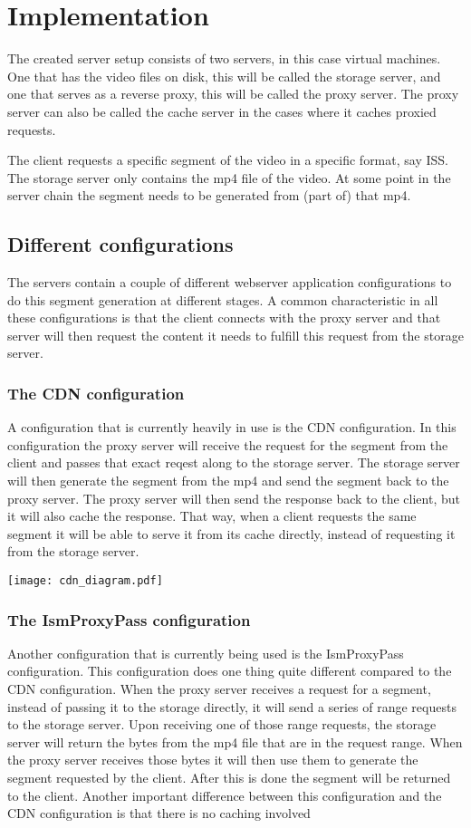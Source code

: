 \documentclass[twoside,openright]{uva-bachelor-thesis}
\begin{document}
\chapter{Implementation}
The created server setup consists of two servers, in this case virtual machines.
One that has the video files on disk, this will be called the storage server,
and one that serves as a reverse proxy, this will be called the proxy server.
The proxy server can also be called the cache server in the cases where it
caches proxied requests.

The client requests a specific segment of the video in a specific format, say
ISS. The storage server only contains the mp4 file of the video. At some point
in the server chain the segment needs to be generated from (part of) that mp4.

\section{Different configurations}
The servers contain a couple of different webserver application configurations
to do this segment generation at different stages. A common characteristic in
all these configurations is that the client connects with the proxy server and
that server will then request the content it needs to fulfill this request from
the storage server.


\subsection{The CDN configuration}
A configuration that is currently heavily in use is the CDN configuration. In
this configuration the proxy server will receive the request for the segment
from the client and passes that exact reqest along to the storage server. The
storage server will then generate the segment from the mp4 and send the segment
back to the proxy server.  The proxy server will then send the response back to
the client, but it will also cache the response. That way, when a client
requests the same segment it will be able to serve it from its cache directly,
instead of requesting it from the storage server.

\texttt{[image: cdn\_diagram.pdf]}



\subsection{The IsmProxyPass configuration}
Another configuration that is currently being used is the IsmProxyPass
configuration. This configuration does one thing quite different compared to the
CDN configuration. When the proxy server receives a request for a segment,
instead of passing it to the storage directly, it will send a series of range
requests to the storage server. Upon receiving one of those range requests, the
storage server will return the bytes from the mp4 file that are in the request
range. When the proxy server receives those bytes it will then use them to
generate the segment requested by the client. After this is done the segment
will be returned to the client. Another important difference between this
configuration and the CDN configuration is that there is no caching involved
\end{document}
